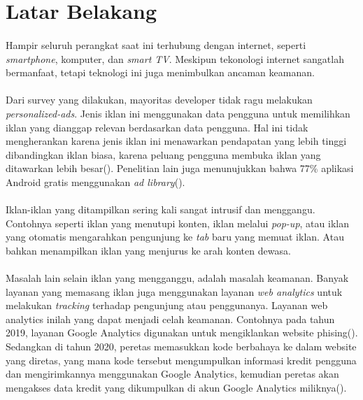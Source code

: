 \documentclass[./bab_1.tex]{subfiles}
\begin{document}
\section{Latar Belakang}
  \paragraph*{} Hampir seluruh perangkat saat ini terhubung
  dengan internet, seperti \textit{smartphone}, komputer,
  dan \textit{smart TV}. Meskipun tekonologi internet
  sangatlah bermanfaat, tetapi teknologi ini juga
  menimbulkan ancaman keamanan.

  \paragraph*{} Dari survey yang dilakukan, mayoritas
  developer tidak ragu melakukan \textit{personalized-ads}.
  Jenis iklan ini menggunakan data pengguna untuk memilihkan
  iklan yang dianggap relevan berdasarkan data pengguna. Hal
  ini tidak mengherankan karena jenis iklan ini menawarkan
  pendapatan yang lebih tinggi dibandingkan iklan biasa,
  karena peluang pengguna membuka iklan yang ditawarkan
  lebih besar(\cite{tahaei2021}). Penelitian lain juga
  menunujukkan bahwa 77\% aplikasi Android gratis
  menggunakan \textit{ad library}(\cite{he2018, jin2021}).

  \paragraph*{} Iklan-iklan yang ditampilkan sering kali
  sangat intrusif dan menggangu. Contohnya seperti iklan
  yang menutupi konten, iklan melalui \textit{pop-up}, atau
  iklan yang otomatis mengarahkan pengunjung ke \textit{tab}
  baru yang memuat iklan. Atau bahkan menampilkan iklan
  yang menjurus ke arah konten dewasa.

  \paragraph*{} Masalah lain selain iklan yang mengganggu,
  adalah masalah keamanan. Banyak layanan yang memasang
  iklan juga menggunakan layanan \textit{web analytics}
  untuk melakukan \textit{tracking} terhadap pengunjung atau
  penggunanya. Layanan web analytics inilah yang dapat
  menjadi celah keamanan. Contohnya pada tahun 2019, layanan
  Google Analytics digunakan untuk mengiklankan website
  phising(\cite{charlie2019}). Sedangkan di tahun 2020,
  peretas memasukkan kode berbahaya ke dalam website yang
  diretas, yang mana kode tersebut mengumpulkan informasi
  kredit pengguna dan mengirimkannya menggunakan Google
  Analytics, kemudian peretas akan mengakses data kredit
  yang dikumpulkan di akun Google Analytics
  miliknya(\cite{ravie2020}).
\end{document}
